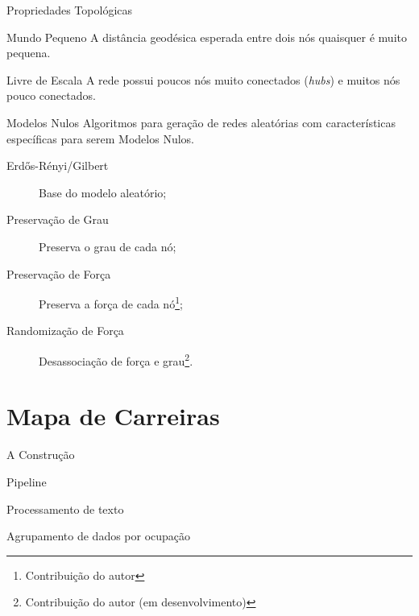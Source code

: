 \documentclass[10pt, hyperref={pdfpagelabels=false}]{beamer}
\begin{document}
\begin{frame}[label=propriedades]{Propriedades Topológicas}
  \large
  \begin{alertblock}{\Large Mundo Pequeno}
    A distância geodésica esperada entre dois nós quaisquer é muito pequena.
  \end{alertblock}
  \begin{alertblock}{\Large Livre de Escala}
    A rede possui poucos nós muito conectados (\textit{hubs}) e muitos nós pouco conectados.
  \end{alertblock}
\end{frame}

\begin{frame}[label=modelos-nulos]{Modelos Nulos}
  Algoritmos para geração de redes aleatórias com características específicas para serem \alert{Modelos Nulos}.
  \begin{description}
    \item[Erdős-Rényi/Gilbert] Base do modelo aleatório;
    \item[Preservação de Grau] Preserva o grau de cada nó;
    \item[Preservação de Força] Preserva a força de cada nó\footnote{Contribuição do autor};
    \item[Randomização de Força] Desassociação de força e grau\footnote{Contribuição do autor (em desenvolvimento)}.
  \end{description}
\end{frame}

\section{Mapa de Carreiras}

\begin{frame}[label=mapa-construcao]{A Construção}
  \begin{center}
    \Large
    Pipeline
    
    Processamento de texto
    
    Agrupamento de dados por ocupação
  \end{center}
\end{frame}
\end{document}
